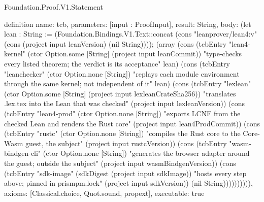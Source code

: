 \begin{lexlean}{Foundation.Proof.V1.Statement}
\begin{semanticmodule}
definition{
  name: tcb,
  parameters: [input : ProofInput],
  result: String,
  body: (let lean : String := (Foundation.Bindings.V1.Text::concat (cons "leanprover/lean4:v" (cons (project input leanVersion) (nil String)))); (array (cons (tcbEntry "lean4-kernel" (ctor Option.some [String] (project input leanCommit)) "type-checks every listed theorem; the verdict is its acceptance" lean) (cons (tcbEntry "leanchecker" (ctor Option.none [String]) "replays each module environment through the same kernel; not independent of it" lean) (cons (tcbEntry "lexlean" (ctor Option.some [String] (project input lexleanCrateSha256)) "translates .lex.tex into the Lean that was checked" (project input lexleanVersion)) (cons (tcbEntry "lean4-prod" (ctor Option.none [String]) "exports LCNF from the checked Lean and renders the Rust core" (project input lean4ProdCommit)) (cons (tcbEntry "rustc" (ctor Option.none [String]) "compiles the Rust core to the Core-Wasm guest, the subject" (project input rustcVersion)) (cons (tcbEntry "wasm-bindgen-cli" (ctor Option.none [String]) "generates the browser adapter around the guest; outside the subject" (project input wasmBindgenVersion)) (cons (tcbEntry "sdk-image" (sdkDigest (project input sdkImage)) "hosts every step above; pinned in prismpm.lock" (project input sdkVersion)) (nil String)))))))))),
  axioms: [Classical.choice, Quot.sound, propext],
  executable: true
}


\end{semanticmodule}
\end{lexlean}
